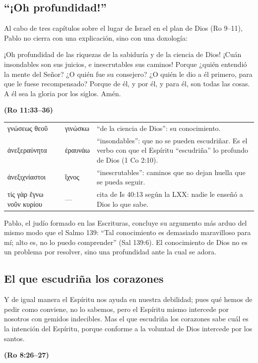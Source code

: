 \documentclass[11pt,letterpaper]{article}
\newcommand{\grc}[1]{\foreignlanguage{ancientgreek}{#1}}
\newcommand{\fuente}[1]{\par\hfill{\upshape\bfseries\small\textcolor{azul}{#1}}}
\begin{document}
\subsection{``¡Oh profundidad!''}
Al cabo de tres capítulos sobre el lugar de Israel en el plan de Dios (Ro 9--11), Pablo no cierra con una explicación, sino con una doxología:

\begin{cita}¡Oh profundidad de las riquezas de la sabiduría y de la ciencia de Dios! ¡Cuán insondables son sus juicios, e inescrutables sus caminos! Porque ¿quién entendió la mente del Señor? ¿O quién fue su consejero? ¿O quién le dio a él primero, para que le fuese recompensado? Porque de él, y por él, y para él, son todas las cosas. A él sea la gloria por los siglos. Amén.\fuente{(Ro 11:33--36)}\end{cita}

\begin{filologia}[Ro 11:33--34]
\begin{tabular}{@{}L{3.2cm}L{1.6cm}L{10cm}@{}}
\grc{γνώσεως θεοῦ} & \grc{γινώσκω} & ``de la ciencia de Dios'': su conocimiento. \\[2pt]
\grc{ἀνεξεραύνητα} & \grc{ἐραυνάω} & ``insondables'': que no se pueden escudriñar. Es el verbo con que el Espíritu ``escudriña'' lo profundo de Dios (1 Co 2:10). \\[2pt]
\grc{ἀνεξιχνίαστοι} & \grc{ἴχνος} & ``inescrutables'': caminos que no dejan huella que se pueda seguir. \\[2pt]
\grc{τίς γὰρ ἔγνω νοῦν κυρίου} & --- & cita de Is 40:13 según la LXX: nadie le enseñó a Dios lo que sabe. \\
\end{tabular}
\end{filologia}

Pablo, el judío formado en las Escrituras, concluye su argumento más arduo del mismo modo que el Salmo 139: ``Tal conocimiento es demasiado maravilloso para mí; alto es, no lo puedo comprender'' (Sal 139:6). El conocimiento de Dios no es un problema por resolver, sino una profundidad ante la cual se adora.

\subsection{El que escudriña los corazones}

\begin{cita}Y de igual manera el Espíritu nos ayuda en nuestra debilidad; pues qué hemos de pedir como conviene, no lo sabemos, pero el Espíritu mismo intercede por nosotros con gemidos indecibles. Mas el que escudriña los corazones sabe cuál es la intención del Espíritu, porque conforme a la voluntad de Dios intercede por los santos.\fuente{(Ro 8:26--27)}\end{cita}
\end{document}
